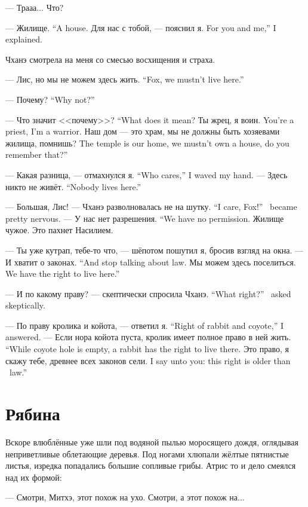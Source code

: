 --- Трааа...
Что?

{--- Жилище.}
{``A house.}
{Для нас с тобой, --- пояснил я.}
{For you and me,'' I explained.}

Чханэ смотрела на меня со смесью восхищения и страха.

{--- Лис, но мы не можем здесь жить.}
{``Fox, we mustn't live here.''}

{--- Почему?}
{``Why not?''}

{--- Что значит <<почему>>?}
{``What does it mean?}
{Ты жрец, я воин.}
{You're a priest, I'm a warrior.}
{Наш дом --- это храм, мы не должны быть хозяевами жилища, помнишь?}
{The temple is our home, we mustn't own a house, do you remember that?''}

{--- Какая разница, --- отмахнулся я.}
{``Who cares,'' I waved my hand.}
{--- Здесь никто не живёт.}
{``Nobody lives here.''}

{--- Большая, Лис! --- Чханэ разволновалась не на шутку.}
{``I care, Fox!'' \Chhanei\ became pretty nervous.}
{--- У нас нет разрешения.}
{``We have no permission.}
Жилище чужое.
Это пахнет Насилием.

--- Ты уже кутрап, тебе-то что, --- шёпотом пошутил я, бросив взгляд на окна.
{--- И хватит о законах.}
{``And stop talking about law.}
{Мы можем здесь поселиться.}
{We have the right to live here.''}

{--- И по какому праву? --- скептически спросила Чханэ.}
{``What right?'' \Chhanei\ asked skeptically.}

{--- По праву кролика и койота, --- ответил я.}
{``Right of rabbit and coyote,'' I answered.}
{--- Если нора койота пуста, кролик имеет полное право в ней жить.}
{``While coyote hole is empty, a rabbit has the right to live there.}
{Это право, я скажу тебе, древнее всех законов сели.}
{I say unto you: this right is older than \Seli\ law.''}

\section{Рябина}

Вскоре влюблённые уже шли под водяной пылью моросящего дождя, оглядывая неприветливые облетающие деревья.
Под ногами хлюпали жёлтые пятнистые листья, изредка попадались большие сопливые грибы.
Атрис то и дело смеялся над их формой:

--- Смотри, Митхэ, этот похож на ухо.
Смотри, а этот похож на...


